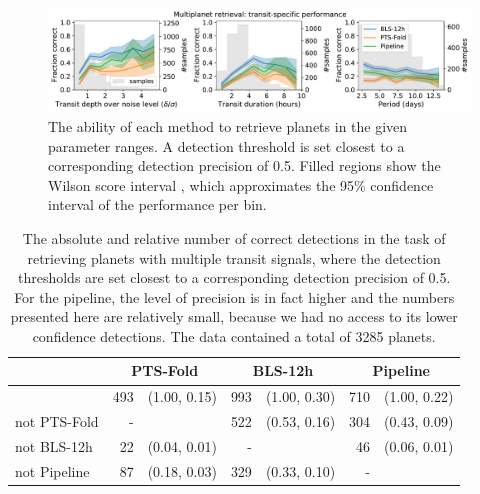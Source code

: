 \begin{figure}
    \centering
    \includegraphics[width=\linewidth]{Experiments/Figures/Multis/multi_transit_specific.pdf}
    \caption{The ability of each method to retrieve planets in the given parameter ranges. A detection threshold is set closest to a corresponding detection precision of 0.5. Filled regions show the Wilson score interval \cite{wilson1927probable}, which approximates the 95\% confidence interval of the performance per bin.}
    \label{fig:multi_transit}
\end{figure}

\begin{table}[]
\centering
\begin{tabular}{@{}lrlrlrl@{}}
\toprule
             & \multicolumn{2}{c}{PTS-Fold} & \multicolumn{2}{c}{BLS-12h} & \multicolumn{2}{c}{Pipeline} \\ \midrule
             & 493      & (1.00, 0.15)      & 993      & (1.00, 0.30)     & 710      & (1.00, 0.22)      \\
not PTS-Fold & -        &                   & 522      & (0.53, 0.16)     & 304      & (0.43, 0.09)      \\
not BLS-12h  & 22       & (0.04, 0.01)      & -        &                  & 46       & (0.06, 0.01)      \\
not Pipeline & 87       & (0.18, 0.03)      & 329      & (0.33, 0.10)     & -        &                   \\ \bottomrule
\end{tabular}
\caption{The absolute and relative number of correct detections in the task of retrieving planets with multiple transit signals, where the detection thresholds are set closest to a corresponding detection precision of 0.5. For the pipeline, the level of precision is in fact higher and the numbers presented here are relatively small, because we had no access to its lower confidence detections. The data contained a total of 3285 planets.}
\end{table}

